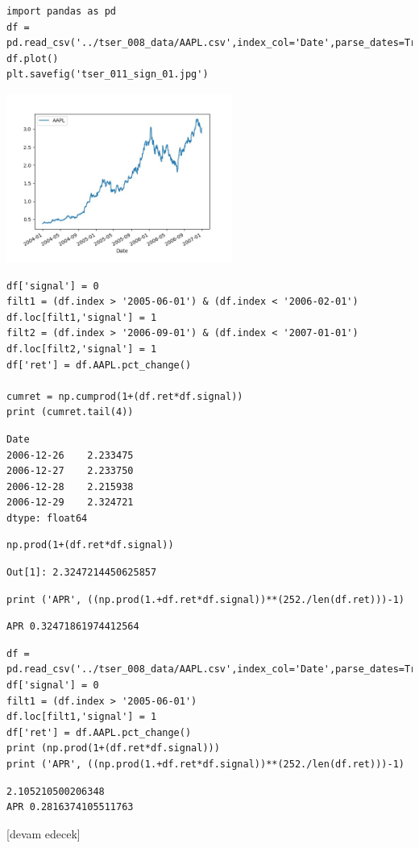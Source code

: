 \documentclass[12pt,fleqn]{article}\usepackage{../../common}
\begin{document}
\begin{verbatim}
import pandas as pd
df = pd.read_csv('../tser_008_data/AAPL.csv',index_col='Date',parse_dates=True)
df.plot()
plt.savefig('tser_011_sign_01.jpg')
\end{verbatim}

\includegraphics[width=20em]{tser_011_sign_01.jpg}

\begin{verbatim}
df['signal'] = 0
filt1 = (df.index > '2005-06-01') & (df.index < '2006-02-01')
df.loc[filt1,'signal'] = 1
filt2 = (df.index > '2006-09-01') & (df.index < '2007-01-01')
df.loc[filt2,'signal'] = 1
df['ret'] = df.AAPL.pct_change()

cumret = np.cumprod(1+(df.ret*df.signal))
print (cumret.tail(4))
\end{verbatim}

\begin{verbatim}
Date
2006-12-26    2.233475
2006-12-27    2.233750
2006-12-28    2.215938
2006-12-29    2.324721
dtype: float64
\end{verbatim}


\begin{verbatim}
np.prod(1+(df.ret*df.signal))
\end{verbatim}

\begin{verbatim}
Out[1]: 2.3247214450625857
\end{verbatim}

\begin{verbatim}
print ('APR', ((np.prod(1.+df.ret*df.signal))**(252./len(df.ret)))-1)
\end{verbatim}

\begin{verbatim}
APR 0.32471861974412564
\end{verbatim}

\begin{verbatim}
df = pd.read_csv('../tser_008_data/AAPL.csv',index_col='Date',parse_dates=True)
df['signal'] = 0
filt1 = (df.index > '2005-06-01')
df.loc[filt1,'signal'] = 1
df['ret'] = df.AAPL.pct_change()
print (np.prod(1+(df.ret*df.signal)))
print ('APR', ((np.prod(1.+df.ret*df.signal))**(252./len(df.ret)))-1)
\end{verbatim}

\begin{verbatim}
2.105210500206348
APR 0.2816374105511763
\end{verbatim}


















[devam edecek]
  
\end{document}
